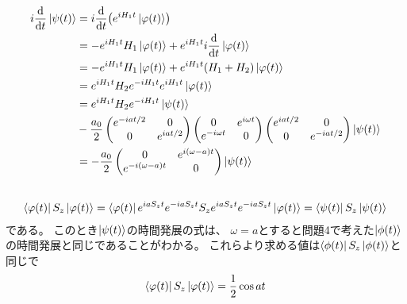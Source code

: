 \documentclass[../../master.tex]{subfiles}
\begin{document}
\subsection{}
\begin{align}
    i\dv{t}\ket{\psi(t)}
    &= i\dv{t}\qty(e^{iH_1t}\ket{\varphi(t)})\\
    &=-e^{iH_1 t}H_1\ket{\varphi(t)}+e^{iH_1t}i\dv{t}\ket{\varphi(t)}\\
    &=-e^{iH_1 t}H_1\ket{\varphi(t)}+e^{iH_1t}(H_1+H_2)\ket{\varphi(t)}\\
    &=e^{iH_1t}H_2e^{-iH_1t} e^{iH_1 t}\ket{\varphi(t)}\\
    &=e^{iH_1t}H_2e^{-iH_1t}\ket{\psi(t)}\\
    &-\frac{a_0}{2}\begin{pmatrix}
        e^{-iat/2} &0\\
        0 & e^{iat/2}
    \end{pmatrix}\begin{pmatrix}
        0 & e^{i\omega t}\\
        e^{-i\omega t}& 0
    \end{pmatrix}\begin{pmatrix}
        e^{iat/2} & 0\\
        0 & e^{-iat/2}
    \end{pmatrix}\ket{\psi(t)}\\
    &= -\frac{a_0}{2}\begin{pmatrix}
        0 & e^{i(\omega -a)t}\\
        e^{-i(\omega - a)t} &0
    \end{pmatrix}\ket{\psi(t)}
\end{align}

\subsection{}
\begin{align}
    \bra{\varphi(t)}S_z\ket{\varphi(t)}
    = \bra{\varphi(t)}e^{iaS_z t}e^{-iaS_zt}S_ze^{iaS_zt}e^{-iaS_zt}\ket{\varphi(t)}
    = \bra{\psi(t)}S_z\ket{\psi(t)}
\end{align}
である。
このとき\(\ket{\psi(t)}\)の時間発展の式は、
\(\omega=a\)とすると問題4で考えた\(\ket{\phi(t)}\)の時間発展と同じであることがわかる。
これらより求める値は\(\bra{\phi(t)}S_z\ket{\phi(t)}\)と同じで
\begin{align}
    \bra{\varphi(t)}S_z\ket{\varphi(t)}  = \frac{1}{2}\cos at
\end{align}
\end{document}

